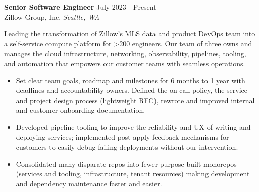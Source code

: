 \begin{mdframed}[linewidth=2,linecolor=blue, innertopmargin=1em, innerbottommargin=1em, topline=false, rightline=false, bottomline=false]
\textbf{Senior Software Engineer} \hfill July 2023 - Present\\
Zillow Group, Inc. \hfill \textit{Seattle, WA}

Leading the transformation of Zillow’s MLS data and product DevOps team into a self-service compute platform for >200 engineers. Our team of three owns and manages the cloud infrastructure, networking, observability, pipelines, tooling, and automation that empowers our customer teams with seamless operations.
\begin{itemize}
    \item Set clear team goals, roadmap and milestones for 6 months to 1 year with deadlines and accountability owners. Defined the on-call policy, the service and project design process (lightweight RFC), rewrote and improved internal and customer onboarding documentation.
    \item Developed pipeline tooling to improve the reliability and UX of writing and deploying services; implemented post-apply feedback mechanisms for customers to easily debug failing deployments without our intervention.
    \item Consolidated many disparate repos into fewer purpose built monorepos  (services and tooling, infrastructure, tenant resources) making development and dependency maintenance faster and easier.
\end{itemize}
\end{mdframed}
